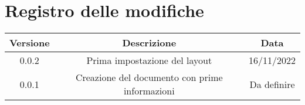 \section*{Registro delle modifiche}
\begin{center}
\begin{tabular}{ c | c | c } 
 Versione & Descrizione & Data \\
 \hline
 0.0.2 & Prima impostazione del layout & 16/11/2022 \\
 0.0.1 & Creazione del documento con prime informazioni & Da definire \\
\end{tabular}
\end{center}